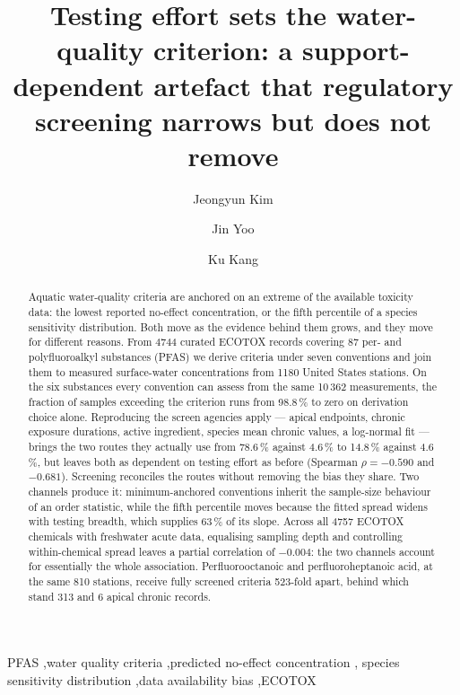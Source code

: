 \documentclass[preprint,12pt]{elsarticle}
\begin{document}
\begin{frontmatter}

\title{Testing effort sets the water-quality criterion:
a support-dependent artefact that regulatory screening narrows but does not remove}

\author[snu]{Jeongyun Kim}
\author[cbdri]{Jin Yoo}
\author[cbdri]{Ku Kang}

\begin{abstract}
Aquatic water-quality criteria are anchored on an extreme of the available
toxicity data: the lowest reported no-effect concentration, or the fifth
percentile of a species sensitivity distribution. Both move as the evidence
behind them grows, and they move for different reasons. From 4744 curated
ECOTOX records covering 87 per- and polyfluoroalkyl substances (PFAS) we derive
criteria under seven conventions and join them to measured surface-water
concentrations from 1180 United States stations. On the six substances every
convention can assess from the same 10\,362 measurements, the fraction of
samples exceeding the criterion runs from 98.8\,\% to zero on derivation choice
alone. Reproducing the screen agencies apply --- apical endpoints, chronic
exposure durations, active ingredient, species mean chronic values, a
log-normal fit --- brings the two routes they actually use from 78.6\,\% against
4.6\,\% to 14.8\,\% against 4.6\,\%, but leaves both as dependent on testing
effort as before (Spearman $\rho = -0.590$ and $-0.681$). Screening reconciles
the routes without removing the bias they share. Two channels produce it:
minimum-anchored conventions inherit the sample-size behaviour of an order
statistic, while the fifth percentile moves because the fitted spread widens
with testing breadth, which supplies 63\,\% of its slope. Across all 4757 ECOTOX
chemicals with freshwater acute data, equalising sampling depth and controlling
within-chemical spread leaves a partial correlation of $-0.004$: the two
channels account for essentially the whole association. Perfluorooctanoic and
perfluoroheptanoic acid, at the same 810 stations, receive fully screened
criteria 523-fold apart, behind which stand 313 and 6 apical chronic records.
\end{abstract}

\begin{keyword}
PFAS \sep water quality criteria \sep predicted no-effect concentration \sep
species sensitivity distribution \sep data availability bias \sep ECOTOX
\end{keyword}

\end{frontmatter}
\end{document}
